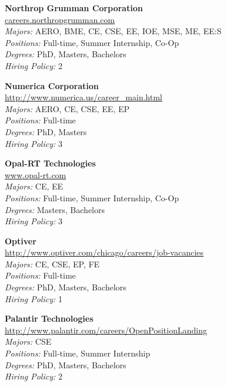 \documentclass{article}
\begin{document}
\begin{center}
\begin{multicols}{3}
\begin{minipage}{.9\columnwidth}{\Large\bf Northrop Grumman Corporation }\\
	\url{careers.northropgrumman.com}\\
	\emph{Majors:} AERO, BME, CE, CSE, EE, IOE, MSE, ME, EE:S\\
	\emph{Positions:} Full-time, Summer Internship, Co-Op\\
	\emph{Degrees:} PhD, Masters, Bachelors\\
	\emph{Hiring Policy:} 2\\
\end{minipage}
 
\begin{minipage}{.9\columnwidth}{\Large\bf Numerica Corporation }\\
	\url{http://www.numerica.us/career_main.html}\\
	\emph{Majors:} AERO, CE, CSE, EE, EP\\
	\emph{Positions:} Full-time\\
	\emph{Degrees:} PhD, Masters\\
	\emph{Hiring Policy:} 3\\
\end{minipage}
 
\begin{minipage}{.9\columnwidth}{\Large\bf Opal-RT Technologies }\\
	\url{www.opal-rt.com}\\
	\emph{Majors:} CE, EE\\
	\emph{Positions:} Full-time, Summer Internship, Co-Op\\
	\emph{Degrees:} Masters, Bachelors\\
	\emph{Hiring Policy:} 3\\
\end{minipage}
 
\begin{minipage}{.9\columnwidth}{\Large\bf Optiver }\\
	\url{http://www.optiver.com/chicago/careers/job-vacancies}\\
	\emph{Majors:} CE, CSE, EP, FE\\
	\emph{Positions:} Full-time\\
	\emph{Degrees:} PhD, Masters, Bachelors\\
	\emph{Hiring Policy:} 1\\
\end{minipage}
 
\begin{minipage}{.9\columnwidth}{\Large\bf Palantir Technologies }\\
	\url{http://www.palantir.com/careers/OpenPositionLanding}\\
	\emph{Majors:} CSE\\
	\emph{Positions:} Full-time, Summer Internship\\
	\emph{Degrees:} PhD, Masters, Bachelors\\
	\emph{Hiring Policy:} 2\\
\end{minipage}
 

\end{multicols}
\end{center}
\end{document}
